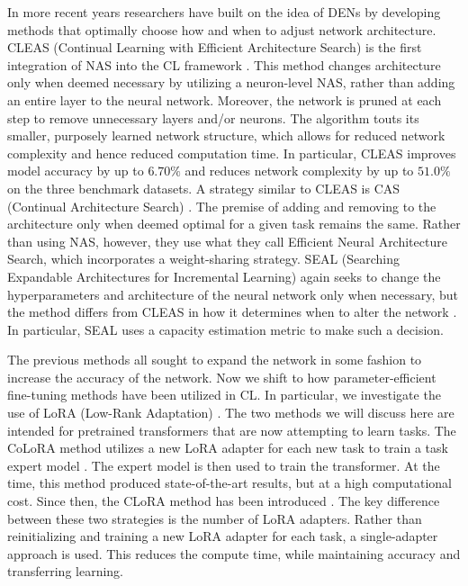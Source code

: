 In more recent years researchers have built on the idea of DENs by developing methods that optimally choose how and when to adjust network architecture. CLEAS (Continual Learning with Efficient Architecture Search) is the first integration of NAS into the CL framework \cite{CLEASgao2022CLEAS}. This method  changes architecture only  when deemed necessary by utilizing a neuron-level NAS, rather than adding an entire layer to the neural network. Moreover, the network is pruned at each step to remove unnecessary layers and/or neurons. The algorithm touts its smaller, purposely learned network structure, which allows for reduced network complexity and hence reduced computation time. In particular, CLEAS improves model accuracy by up to $6.70\%$ and reduces network complexity by up to $51.0\%$ on the three benchmark datasets. A strategy similar to CLEAS is CAS (Continual Architecture Search)  \cite{CASpasunuru2019continual}. The premise of  adding and removing to the architecture only when deemed optimal for a given task remains the same. Rather than using NAS, however, they use what they call Efficient Neural Architecture Search, which incorporates a weight-sharing strategy. SEAL (Searching Expandable Architectures for Incremental Learning) again seeks to change  the hyperparameters and architecture of the neural network only when necessary, but the method differs from CLEAS in how it determines when to alter the network \cite{SEALgambella2025SEAL}. In particular, SEAL uses a capacity estimation metric to make such a decision.

The previous methods all sought to expand the network in some fashion to increase the accuracy of the network. Now we shift to how parameter-efficient fine-tuning methods have been utilized in CL. In particular, we investigate the use of LoRA (Low-Rank Adaptation) \cite{LORAhu2022lora}. The two methods we will discuss here are intended for pretrained transformers that are now attempting to learn tasks. The CoLoRA method utilizes a new LoRA adapter for each new task to train a task expert model \cite{wistuba2023continual}. The expert model is then used to train the transformer. At the time, this method produced state-of-the-art results, but at a high computational cost. Since then, the CLoRA method has been introduced \cite{CLORAmuralidhara2025}. The key difference between these two strategies is the number of LoRA adapters. Rather than reinitializing and training a new LoRA adapter for each task, a single-adapter approach is used. This reduces the compute time, while maintaining accuracy and transferring learning.

